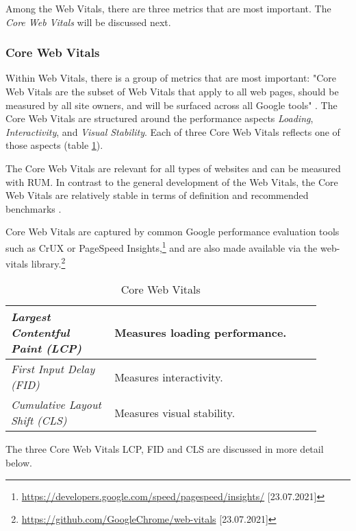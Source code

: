 Among the Web Vitals, there are three metrics that are most important.
The \textit{Core Web Vitals} will be discussed next.



\subsubsection{Core Web Vitals} %
\label{subsubsection:core_web_vitals}

Within Web Vitals, there is a group of metrics that are most important:
"Core Web Vitals are the subset of Web Vitals that apply to all web pages, should be measured by all site owners, and will be surfaced across all Google tools" \cite{2020WaltonVitals}.
The Core Web Vitals are structured around the performance aspects \textit{Loading}, \textit{Interactivity}, and \textit{Visual Stability}.
Each of three Core Web Vitals reflects one of those aspects (table \ref{table:core_web_vitals}).

The Core Web Vitals are relevant for all types of websites and can be measured with RUM.
In contrast to the general development of the Web Vitals, the Core Web Vitals are relatively stable in terms of definition and recommended benchmarks \cite{2020WaltonVitals}.

Core Web Vitals are captured by common Google performance evaluation tools such as CrUX or PageSpeed Insights,\footnote{\url{https://developers.google.com/speed/pagespeed/insights/} [23.07.2021]}
and are also made available via the web-vitals library.\footnote{\url{https://github.com/GoogleChrome/web-vitals} [23.07.2021]}

\begin{table}[h]
	\small
	\centering
	\begin{tabular}{ | p{0.3\linewidth} | p{0.6\linewidth} | }
	\hline
	\textit{Largest Contentful Paint (LCP)} & Measures loading performance.  \\
	\hline
	\textit{First Input Delay (FID)} & Measures interactivity. \\
	\hline
	\textit{Cumulative Layout Shift (CLS)} & Measures visual stability. \\
	\hline
	\end{tabular}
	\medskip
	\caption{Core Web Vitals}
	\label{table:core_web_vitals}
\end{table}

The three Core Web Vitals LCP, FID and CLS are discussed in more detail below.

